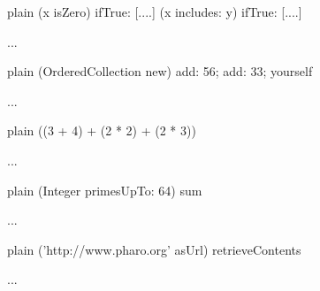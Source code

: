 \documentclass[10pt,twoside,english]{_support/latex/sbabook/sbabook}
\begin{document}
\begin{displaycode}{plain}
(x isZero)
     ifTrue: [....]
(x includes: y)
     ifTrue: [....]
	 




 ...
\end{displaycode}

\begin{displaycode}{plain}
(OrderedCollection new)
    add: 56; 
    add: 33; 
    yourself




 ...
\end{displaycode}

\begin{displaycode}{plain}
((3 + 4) + (2 * 2) + (2 * 3))


 ...
\end{displaycode}

\begin{displaycode}{plain}
(Integer primesUpTo: 64) sum


 ...
\end{displaycode}

\begin{displaycode}{plain}
('http://www.pharo.org' asUrl) retrieveContents


 ...
\end{displaycode}


\backmatter



\end{document}
